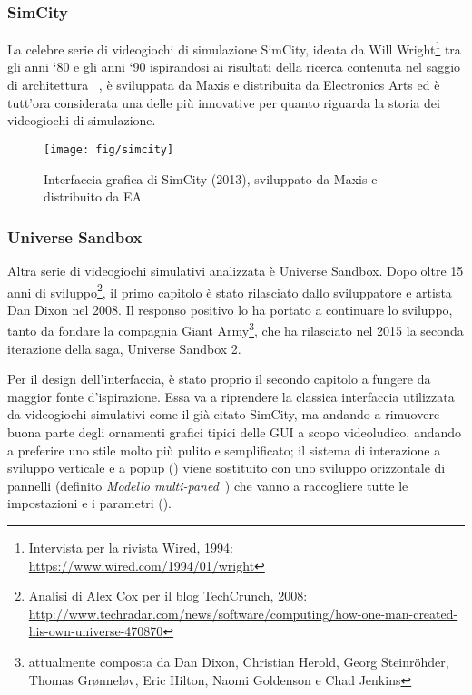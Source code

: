             \subsubsection{SimCity}\label{subsubsec:simcity}
                La celebre serie di videogiochi di simulazione SimCity, ideata da Will Wright\footnote{Intervista per la rivista Wired, 1994:
                \url{https://www.wired.com/1994/01/wright}} tra gli anni `80 e gli anni `90 ispirandosi ai risultati della ricerca contenuta nel saggio di architettura ~\cite{aPatternLanguage}, è sviluppata da Maxis e distribuita da Electronics Arts ed è tutt'ora considerata una delle più innovative per quanto riguarda la storia dei videogiochi di simulazione.

                \begin{figure}[htbp]
                    \centering
                    \texttt{[image: fig/simcity]}
                    \caption{Interfaccia grafica di SimCity (2013), sviluppato da Maxis e distribuito da EA}
                    \label{fig:simcity}
                \end{figure}

            \subsubsection{Universe Sandbox}\label{subsubsec:universesandbox}
                Altra serie di videogiochi simulativi analizzata è Universe Sandbox.
                Dopo oltre 15 anni di sviluppo\footnote{Analisi di Alex Cox per il blog TechCrunch, 2008:
                \url{http://www.techradar.com/news/software/computing/how-one-man-created-his-own-universe-470870}}, il primo capitolo è stato rilasciato dallo sviluppatore e artista Dan Dixon nel 2008.
                Il responso positivo lo ha portato a continuare lo sviluppo, tanto da fondare la compagnia Giant Army\footnote{attualmente composta da Dan Dixon, Christian Herold, Georg Steinröhder, Thomas Grønneløv, Eric Hilton, Naomi Goldenson e Chad Jenkins}, che ha rilasciato nel 2015 la seconda iterazione della saga, Universe Sandbox 2.

                Per il design dell'interfaccia, è stato proprio il secondo capitolo a fungere da maggior fonte d'ispirazione.
                Essa va a riprendere la classica interfaccia utilizzata da videogiochi simulativi come il già citato SimCity, ma andando a rimuovere buona parte degli ornamenti grafici tipici delle GUI a scopo videoludico, andando a preferire uno stile molto più pulito e semplificato;
                il sistema di interazione a sviluppo verticale e a popup () viene sostituito con uno sviluppo orizzontale di pannelli (definito \emph{Modello multi-paned}~\cite{multipanedmodel}) che vanno a raccogliere tutte le impostazioni e i parametri ().

